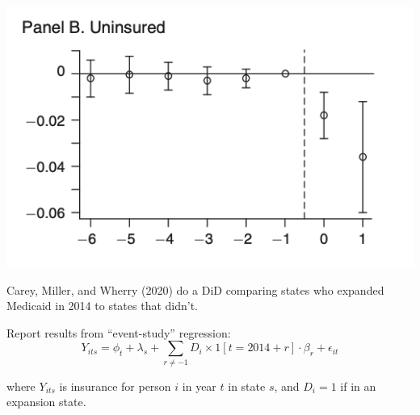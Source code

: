 \documentclass[aspectratio = 169, 13pt]{beamer}
\begin{document}
\begin{frame}
	\begin{minipage}{.5\linewidth}
		\includegraphics[width=0.99\linewidth]{Figures/Carey-event-study.png}
	\end{minipage}%
	\begin{minipage}{0.5\linewidth}
		\begin{wideitemize}
			\item
			Carey, Miller, and Wherry (2020) do a DiD comparing states who expanded Medicaid in 2014 to states that didn't. 
			
			\item
			Report results from ``event-study'' regression: 
			$$Y_{its} =  \phi_{t} + \lambda_s + \sum_{r\neq -1}  D_i \times 1[t = 2014 + r] \cdot  \beta_r   + \epsilon_{it} $$
			
			\noindent where $Y_{its}$ is insurance for person $i$ in year $t$ in state $s$, and $D_i = 1$ if in an expansion state.
		\end{wideitemize}
	\end{minipage}
	
\end{frame}
\end{document}
